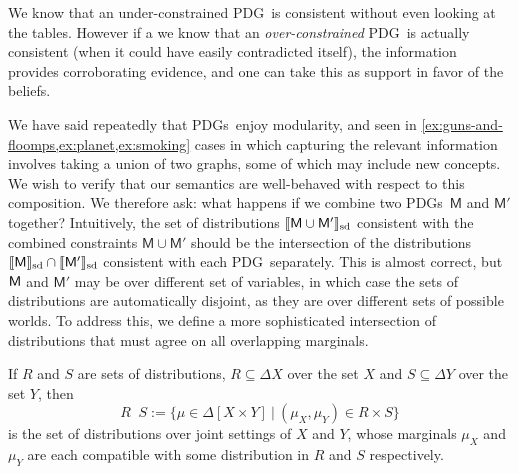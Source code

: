 \documentclass{article}
\newcommand{\notation}[2][]{#1}
\renewcommand{\notation}[2][]{{\color{notationcolor} #2}}
\newcommand\SD{_{\text{sd}}}
\DeclareMathOperator\dcap{\mathop{\dot\cap}}
\newcommand{\sfM}{\mathsf M}
\newcommand{\MN}{PDG}
\newcommand{\MNs}{\MN s}
\numberwithin{equation}{section}
\begin{document}
\begin{notfocus}
{{	We know that an under-constrained \MN\ is consistent without even looking at the tables. However if a we know that an \emph{over-constrained} \MN\ is actually consistent (when it could have easily contradicted itself), the information provides corroborating evidence, and one can take this as support in favor of the beliefs. 
	}


	We have said repeatedly that \MNs\ enjoy modularity, and seen
        in \cref{ex:guns-and-floomps,ex:planet,ex:smoking} cases in
        which capturing the relevant information involves taking a
        union of two graphs, some of which may include new
        concepts. We wish to verify that our semantics are
        well-behaved with respect to this composition.	  
	We therefore ask: what happens if we combine two \MNs\ $\sfM$
        and $\sfM'$ together? Intuitively, the set of distributions
        $\bbr{\sfM \cup \sfM'}\SD$ consistent with the combined
        constraints $\sfM\cup \sfM'$ should be the intersection of the
        distributions $\bbr{\sfM}\SD \cap \bbr{\sfM'}\SD$ consistent
        with each \MN\ separately. This is almost correct, but $\sf M$
        and $\sfM'$ may be over different set of variables, in which
        case the sets of distributions are automatically disjoint, as
        they are over different sets of possible worlds. To address
        this, we define a more sophisticated intersection of
        distributions that must agree on all overlapping
        marginals. %
	
	\begin{defn}[$\dcap$]\label{def:marginal-dist-intersection}
		If $R$ and $S$ are sets of distributions, $R \subseteq \Delta X$ over the set $X$ and $S\subseteq \Delta Y$ over the set $Y$, then
			{$$R \dcap S := \Big\{ \mu \in  \Delta [X \!\times\! Y] ~\Big|~ (\mu_{X}, \mu_{Y}) \in R \times S \Big\}  $$}%
		is the set of distributions over joint settings of $X$ and $Y$, whose marginals $\mu_X$ and $\mu_Y$ are each compatible with some distribution in $R$ and $S$ respectively. 
		

\end{defn}}
\end{notfocus}
\end{document}
